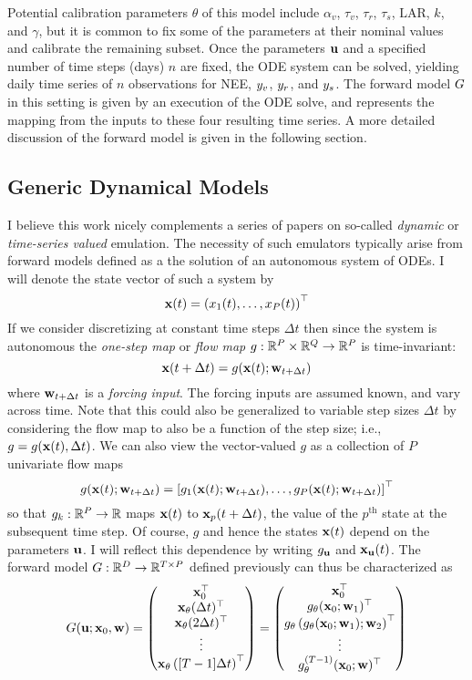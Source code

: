 \documentclass[12pt]{article}
\begin{document}
Potential calibration parameters $\theta$ of this model include $\alpha_v$, $\tau_v$, $\tau_r$, $\tau_s$, $\text{LAR}$, $k$, and $\gamma$, but it is common to fix some of the parameters at their 
nominal values and calibrate the remaining subset. 
Once the parameters $\mathbf{u}$ and a specified number of time steps (days) $n$ are fixed, the ODE system can be solved, yielding daily time series of $n$
observations for NEE, $y_v$, $y_r$, and $y_s$. The forward model $G$ in this setting is given by an execution of the ODE solve, and represents
the mapping from the inputs to these four resulting time series. A more detailed discussion of the forward model is given in the following section. 

\subsection{Generic Dynamical Models}
I believe this work nicely complements a series of papers on so-called \textit{dynamic} or \textit{time-series valued} emulation. The necessity of such emulators typically arise from forward models 
defined as a the solution of an autonomous system of ODEs. I will denote the state vector of such a system by 
\[\mathbf{x}(t) = \left(x_1(t), \dots, x_P(t) \right)^{\top} \]
If we consider discretizing at constant time steps $\Delta t$ then since the system is autonomous the \textit{one-step map} or \textit{flow map} $g: \mathbb{R}^P \times \mathbb{R}^Q \to \mathbb{R}^P$ is time-invariant: 
 \[\mathbf{x}(t + \Delta t) = g(\mathbf{x}(t); \mathbf{w}_{t + \Delta t})\]
 where $\mathbf{w}_{t + \Delta t}$ is a \textit{forcing input}. The forcing inputs are assumed known, and vary across time. 
 Note that this could also be generalized to variable step sizes $\Delta t$ by considering the flow map to also be a function of the step size; i.e., $g = g(\mathbf{x}(t), \Delta t)$. We can also view the 
 vector-valued $g$ as a collection of $P$ univariate flow maps
 \[g(\mathbf{x}(t); \mathbf{w}_{t + \Delta t}) = \left[g_1(\mathbf{x}(t); \mathbf{w}_{t + \Delta t}), \dots, g_P(\mathbf{x}(t); \mathbf{w}_{t + \Delta t}) \right]^{\top}\]
 so that $g_k: \mathbb{R}^P \to \mathbb{R}$ maps $\mathbf{x}(t)$ to $\mathbf{x}_p(t + \Delta t)$, the value of the $p^{\text{th}}$ state at the subsequent time step. Of course, $g$ and hence the states $\mathbf{x}(t)$ depend on 
 the parameters $\mathbf{u}$. I will reflect this dependence by writing $g_{\mathbf{u}}$ and $\mathbf{x}_{\mathbf{u}}(t)$. The forward model $G: \mathbb{R}^{D} \to \mathbb{R}^{T \times P}$ defined previously can thus be characterized 
 as 
 \[
 G(\mathbf{u}; \mathbf{x}_0, \mathbf{w}) = \begin{pmatrix} \mathbf{x}_0^{\top} \\ \mathbf{x}_\theta(\Delta t)^{\top} \\  \mathbf{x}_\theta(2\Delta t)^{\top} \\ \vdots \\ \mathbf{x}_\theta\left([T-1]\Delta t\right)^{\top} \end{pmatrix} = 
 \begin{pmatrix} \mathbf{x}_0^{\top} \\ g_\theta(\mathbf{x}_0; \mathbf{w}_1)^{\top} \\  g_\theta\left(g_\theta(\mathbf{x}_0; \mathbf{w}_1); \mathbf{w}_2 \right)^{\top} \\ \vdots \\ g_\theta^{(T-1)}(\mathbf{x}_0; \mathbf{w})^{\top} \end{pmatrix}
 \]
\end{document}
